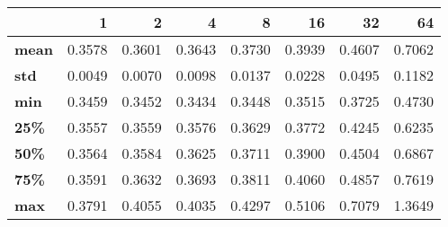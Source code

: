 \begin{tabular}{lrrrrrrr}
\toprule
{} &      1  &      2  &      4  &      8  &      16 &      32 &      64 \\
\midrule
\textbf{mean} &  0.3578 &  0.3601 &  0.3643 &  0.3730 &  0.3939 &  0.4607 &  0.7062 \\
\textbf{std } &  0.0049 &  0.0070 &  0.0098 &  0.0137 &  0.0228 &  0.0495 &  0.1182 \\
\textbf{min } &  0.3459 &  0.3452 &  0.3434 &  0.3448 &  0.3515 &  0.3725 &  0.4730 \\
\textbf{25\% } &  0.3557 &  0.3559 &  0.3576 &  0.3629 &  0.3772 &  0.4245 &  0.6235 \\
\textbf{50\% } &  0.3564 &  0.3584 &  0.3625 &  0.3711 &  0.3900 &  0.4504 &  0.6867 \\
\textbf{75\% } &  0.3591 &  0.3632 &  0.3693 &  0.3811 &  0.4060 &  0.4857 &  0.7619 \\
\textbf{max } &  0.3791 &  0.4055 &  0.4035 &  0.4297 &  0.5106 &  0.7079 &  1.3649 \\
\bottomrule
\end{tabular}
